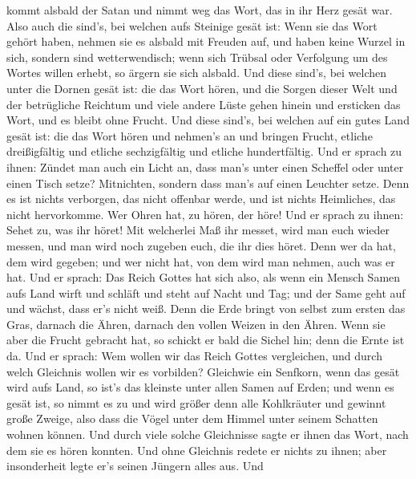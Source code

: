 kommt alsbald der Satan und nimmt weg das Wort, das in ihr Herz gesät
war.  Also auch die sind's, bei welchen aufs Steinige gesät
ist: Wenn sie das Wort gehört haben, nehmen sie es alsbald mit Freuden
auf,  und haben keine Wurzel in sich, sondern sind
wetterwendisch; wenn sich Trübsal oder Verfolgung um des Wortes willen
erhebt, so ärgern sie sich alsbald.  Und diese sind's, bei
welchen unter die Dornen gesät ist: die das Wort hören, 
und die Sorgen dieser Welt und der betrügliche Reichtum und viele andere
Lüste gehen hinein und ersticken das Wort, und es bleibt ohne Frucht.
 Und diese sind's, bei welchen auf ein gutes Land gesät
ist: die das Wort hören und nehmen's an und bringen Frucht, etliche
dreißigfältig und etliche sechzigfältig und etliche hundertfältig.
 Und er sprach zu ihnen: Zündet man auch ein Licht an, dass
man's unter einen Scheffel oder unter einen Tisch setze? Mitnichten,
sondern dass man's auf einen Leuchter setze.  Denn es ist
nichts verborgen, das nicht offenbar werde, und ist nichts Heimliches,
das nicht hervorkomme.  Wer Ohren hat, zu hören, der höre!
 Und er sprach zu ihnen: Sehet zu, was ihr höret! Mit
welcherlei Maß ihr messet, wird man euch wieder messen, und man wird
noch zugeben euch, die ihr dies höret.  Denn wer da hat,
dem wird gegeben; und wer nicht hat, von dem wird man nehmen, auch was
er hat.  Und er sprach: Das Reich Gottes hat sich also, als
wenn ein Mensch Samen aufs Land wirft  und schläft und
steht auf Nacht und Tag; und der Same geht auf und wächst, dass er's
nicht weiß.  Denn die Erde bringt von selbst zum ersten das
Gras, darnach die Ähren, darnach den vollen Weizen in den Ähren.
 Wenn sie aber die Frucht gebracht hat, so schickt er bald
die Sichel hin; denn die Ernte ist da.  Und er sprach: Wem
wollen wir das Reich Gottes vergleichen, und durch welch Gleichnis
wollen wir es vorbilden?  Gleichwie ein Senfkorn, wenn das
gesät wird aufs Land, so ist's das kleinste unter allen Samen auf Erden;
 und wenn es gesät ist, so nimmt es zu und wird größer denn
alle Kohlkräuter und gewinnt große Zweige, also dass die Vögel unter dem
Himmel unter seinem Schatten wohnen können.  Und durch
viele solche Gleichnisse sagte er ihnen das Wort, nach dem sie es hören
konnten.  Und ohne Gleichnis redete er nichts zu ihnen;
aber insonderheit legte er's seinen Jüngern alles aus.  Und
